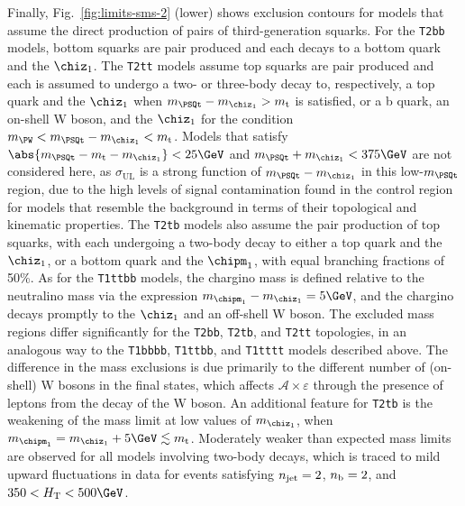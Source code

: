 Finally, Fig.~\ref{fig:limits-sms-2} (lower) shows exclusion contours
for models that assume the direct production of pairs of
third-generation squarks. For the \texttt{T2bb} models, bottom squarks
are pair produced and each decays to a bottom quark and the
$\chiz_1$. The \texttt{T2tt} models assume top squarks are pair
produced and each is assumed to undergo a two- or three-body decay to,
respectively, a top quark and the $\chiz_1$ when $m_{\PSQt} -
m_{\chiz_1} > m_\text{t}$ is satisfied, or a b quark, an on-shell W
boson, and the $\chiz_1$ for the condition $m_{\PW} < m_{\PSQt} -
m_{\chiz_1} < m_\text{t}$. Models that satisfy $\abs{m_{\PSQt} -
  m_\text{t} - m_{\chiz_1}} < 25\GeV$ and $m_{\PSQt} + m_{\chiz_1} <
375\GeV$ are not considered here, as $\sigma_\text{UL}$ is a strong
function of $m_{\PSQt} - m_{\chiz_1}$ in this low-$m_{\PSQt}$ region,
due to the high levels of signal contamination found in the \mj
control region for models that resemble the \ttbar background in terms
of their topological and kinematic properties. The \texttt{T2tb}
models also assume the pair production of top squarks, with each
undergoing a two-body decay to either a top quark and the $\chiz_1$,
or a bottom quark and the $\chipm_1$, with equal branching fractions
of 50\%. As for the \texttt{T1ttbb} models, the chargino mass is
defined relative to the neutralino mass via the expression
$m_{\chipm_1} - m_{\chiz_1} = 5\GeV$, and the chargino decays promptly
to the $\chiz_1$ and an off-shell W boson. The excluded mass regions
differ significantly for the \texttt{T2bb}, \texttt{T2tb}, and
\texttt{T2tt} topologies, in an analogous way to the \texttt{T1bbbb},
\texttt{T1ttbb}, and \texttt{T1tttt} models described above. The
difference in the mass exclusions is due primarily to the different
number of (on-shell) W bosons in the final states, which affects
$\mathcal{A} \times \varepsilon$ through the presence of leptons from
the decay of the W boson. An additional feature for \texttt{T2tb} is
the weakening of the mass limit at low values of $m_{\chiz_1}$, when
$m_{\chipm_1} = m_{\chiz_1} + 5\GeV \lesssim m_\text{t}$. Moderately
weaker than expected mass limits are observed for all models involving
two-body decays, which is traced to mild upward fluctuations in data
for events satisfying $n_{\text{jet}} = 2$, $n_{\text{b}} = 2$, and $350 < \scalht <
500\GeV$.

